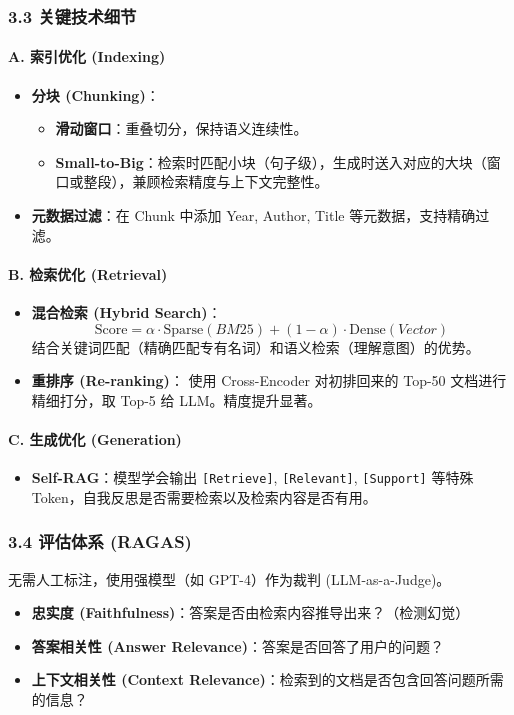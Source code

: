 \documentclass[a4paper, 11pt]{ctexart}
\begin{document}
\subsubsection{3.3 关键技术细节}
\paragraph{A. 索引优化 (Indexing)}
\begin{itemize}
    \item \textbf{分块 (Chunking)}：
    \begin{itemize}
        \item \textbf{滑动窗口}：重叠切分，保持语义连续性。
        \item \textbf{Small-to-Big}：检索时匹配小块（句子级），生成时送入对应的大块（窗口或整段），兼顾检索精度与上下文完整性。
    \end{itemize}
    \item \textbf{元数据过滤}：在 Chunk 中添加 Year, Author, Title 等元数据，支持精确过滤。
\end{itemize}

\paragraph{B. 检索优化 (Retrieval)}
\begin{itemize}
    \item \textbf{混合检索 (Hybrid Search)}：
    $$ \text{Score} = \alpha \cdot \text{Sparse}(BM25) + (1-\alpha) \cdot \text{Dense}(Vector) $$
    结合关键词匹配（精确匹配专有名词）和语义检索（理解意图）的优势。
    \item \textbf{重排序 (Re-ranking)}：
    使用 Cross-Encoder 对初排回来的 Top-50 文档进行精细打分，取 Top-5 给 LLM。精度提升显著。
\end{itemize}

\paragraph{C. 生成优化 (Generation)}
\begin{itemize}
    \item \textbf{Self-RAG}：模型学会输出 \texttt{[Retrieve]}, \texttt{[Relevant]}, \texttt{[Support]} 等特殊 Token，自我反思是否需要检索以及检索内容是否有用。
\end{itemize}

\subsubsection{3.4 评估体系 (RAGAS)}
无需人工标注，使用强模型（如 GPT-4）作为裁判 (LLM-as-a-Judge)。
\begin{itemize}
    \item \textbf{忠实度 (Faithfulness)}：答案是否由检索内容推导出来？（检测幻觉）
    \item \textbf{答案相关性 (Answer Relevance)}：答案是否回答了用户的问题？
    \item \textbf{上下文相关性 (Context Relevance)}：检索到的文档是否包含回答问题所需的信息？
\end{itemize}
\newpage
\end{document}

